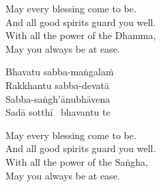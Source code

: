 \begin{english-verses}
  May every blessing come to be.\\
  And all good spirits guard you well.\\
  With all the power of the Dhamma,\\
  May you always be at ease.
\end{english-verses}

\ifninebythirteen\clearpage\fi

\begin{pali-hang-continued}
  Bhavatu sabba-maṅgalaṁ\\
  Rakkhantu sabba-devatā\\
  Sabba-saṅgh'ānubhāvena\\
  Sadā sotthī \breathmark\ bhavantu te
\end{pali-hang-continued}

\ifafive\clearpage\fi

\begin{english-verses}
  May every blessing come to be.\\
  And all good spirits guard you well.\\
  \ifbfive\enlargethispage{2\baselineskip}\fi
  With all the power of the Saṅgha,\\
  May you always be at ease.
\end{english-verses}

\ifbfive\vspace{-0.25cm}\fi

\suttaRef{[MJG]}

\ifdigital{}\fi

